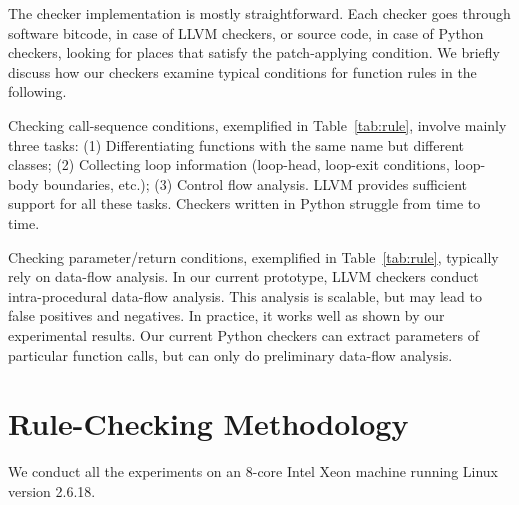 
The checker implementation is mostly straightforward. Each checker goes through 
software bitcode, in case of LLVM checkers, or source code, in case of Python 
checkers, looking for places that satisfy the patch-applying condition. We
briefly discuss how our checkers examine typical conditions for function rules in the following.

Checking call-sequence conditions, exemplified in Table~\ref{tab:rule}, involve mainly three tasks: 
(1) Differentiating functions with the same name but different classes; 
(2) Collecting loop information (loop-head, loop-exit conditions, 
loop-body boundaries, etc.); (3) Control flow analysis. 
LLVM provides sufficient support for all these tasks. Checkers written in Python struggle from time to time.

Checking parameter/return conditions, exemplified in Table~\ref{tab:rule}, 
typically rely on data-flow analysis. In our current prototype, LLVM checkers 
conduct intra-procedural data-flow analysis. This analysis is scalable, 
but may lead to false positives and negatives. In practice, it works
well as shown by our experimental results. Our current Python checkers can 
extract parameters of particular function calls, but can only do preliminary data-flow analysis.




\section{Rule-Checking Methodology}
\label{sec:detection_meth}

We conduct all the experiments on an 8-core Intel Xeon
machine running Linux version 2.6.18. 

